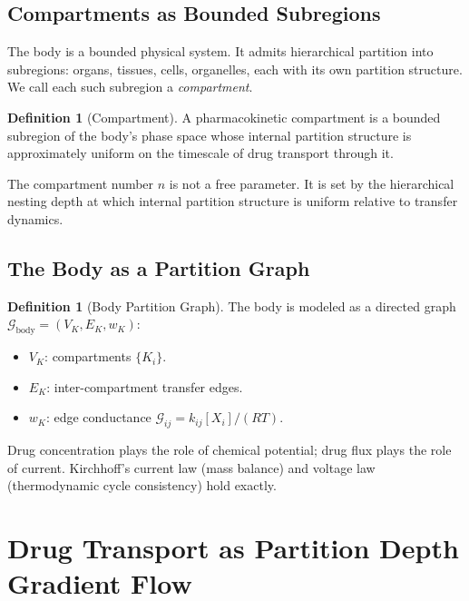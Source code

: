 \documentclass[twocolumn,10pt,a4paper]{article}
\theoremstyle{definition}
\newtheorem{definition}[theorem]{Definition}
\theoremstyle{remark}
\newcommand{\Gcond}{\mathcal{G}}
\begin{document}
\subsection{Compartments as Bounded Subregions}

The body is a bounded physical system. It admits hierarchical partition into subregions: organs, tissues, cells, organelles, each with its own partition structure. We call each such subregion a \emph{compartment}.

\begin{definition}[Compartment]
A pharmacokinetic compartment is a bounded subregion of the body's phase space whose internal partition structure is approximately uniform on the timescale of drug transport through it.
\end{definition}

The compartment number $n$ is not a free parameter. It is set by the hierarchical nesting depth at which internal partition structure is uniform relative to transfer dynamics.

\subsection{The Body as a Partition Graph}

\begin{definition}[Body Partition Graph]
The body is modeled as a directed graph $\Gcond_{\mathrm{body}} = (V_K, E_K, w_K)$:
\begin{itemize}[leftmargin=*,nosep]
    \item $V_K$: compartments $\{K_i\}$.
    \item $E_K$: inter-compartment transfer edges.
    \item $w_K$: edge conductance $\Gcond_{ij} = k_{ij}[X_i]/(RT)$.
\end{itemize}
\end{definition}

Drug concentration plays the role of chemical potential; drug flux plays the role of current. Kirchhoff's current law (mass balance) and voltage law (thermodynamic cycle consistency) hold exactly.

\section{Drug Transport as Partition Depth Gradient Flow}
\end{document}
